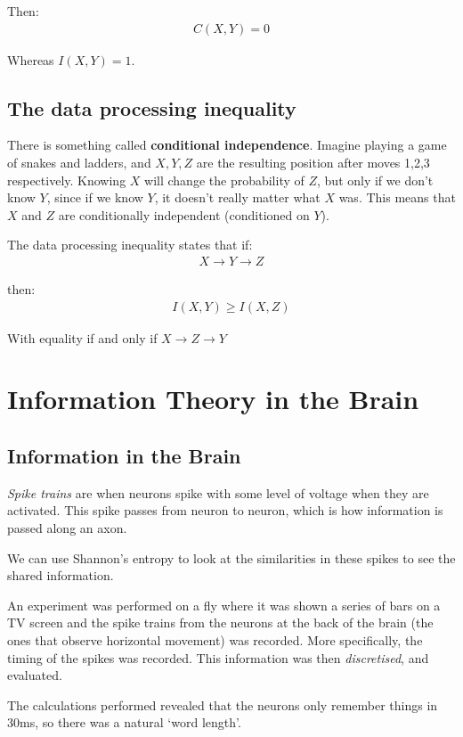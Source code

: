 \documentclass[11pt,a4paper,titlepage,dvipsnames,cmyk]{scrartcl}
\begin{document}
Then:
\begin{align*}
C(X,Y) = 0
\end{align*}

Whereas $I(X,Y) = 1$.

\subsection{The data processing inequality}
There is something called \textbf{conditional independence}. Imagine playing a game of snakes and ladders, and $X,Y,Z$ are the resulting position after moves 1,2,3 respectively. Knowing $X$ will change the probability of $Z$, but only if we don't know $Y$, since if we know $Y$, it doesn't really matter what $X$ was. This means that $X$ and $Z$ are conditionally independent (conditioned on $Y$).

The data processing inequality states that if:
\begin{align*}
X \rightarrow Y \rightarrow Z
\end{align*}

then:
\begin{align*}
I(X,Y) \ge I(X,Z)
\end{align*}

With equality if and only if $X \rightarrow Z \rightarrow Y$

\section{Information Theory in the Brain}
\subsection{Information in the Brain}
\textit{Spike trains} are when neurons spike with some level of voltage when they are activated. This spike passes from neuron to neuron, which is how information is passed along an axon.

We can use Shannon's entropy to look at the similarities in these spikes to see the shared information.

An experiment was performed on a fly where it was shown a series of bars on a TV screen and the spike trains from the neurons at the back of the brain (the ones that observe horizontal movement) was recorded. More specifically, the timing of the spikes was recorded. This information was then \textit{discretised}, and evaluated.

The calculations performed revealed that the neurons only remember things in 30ms, so there was a natural `word length'. 
\end{document}
